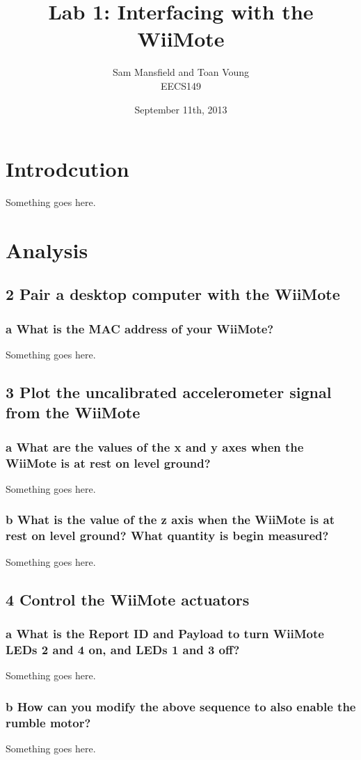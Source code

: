 \documentclass[10pt,a4paper]{article}
\begin{document}
\title{Lab 1: Interfacing with the WiiMote}
\author{Sam Mansfield and Toan Voung \\
  EECS149}
\date{September 11th, 2013}
\maketitle

\section*{Introdcution}
  Something goes here.
\section*{Analysis}
  \subsection*{2 Pair a desktop computer with the WiiMote}
    \subsubsection*{a What is the MAC address of your WiiMote?}
      Something goes here.
  \subsection*{3 Plot the uncalibrated accelerometer signal from the WiiMote} 
    \subsubsection*{a What are the values of the x and y axes when the WiiMote is at rest on level ground?}
      Something goes here.
    \subsubsection*{b What is the value of the z axis when the WiiMote is at rest on level ground? What quantity is begin measured?}
      Something goes here.
  \subsection*{4 Control the WiiMote actuators}
    \subsubsection*{a What is the Report ID and Payload to turn WiiMote LEDs 2 and 4 on, and LEDs 1 and 3 off?}
      Something goes here.
    \subsubsection*{b How can you modify the above sequence to also enable the rumble motor?}
      Something goes here.
\end{document}
